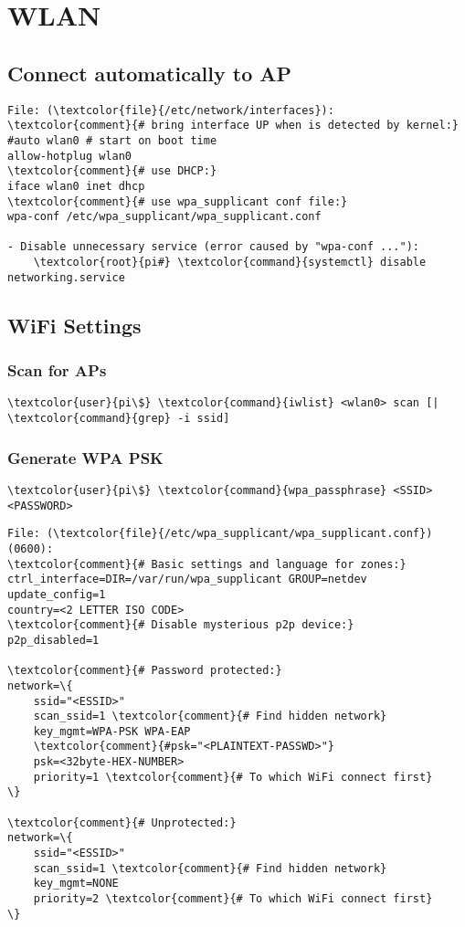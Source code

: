 \documentclass[10pt, a4paper, onecolumn, openany]{book} %
\begin{document}
\section{WLAN}
\subsection{Connect automatically to AP}
\begin{Verbatim}[commandchars=\\\{\}]
File: (\textcolor{file}{/etc/network/interfaces}):
\textcolor{comment}{# bring interface UP when is detected by kernel:}
#auto wlan0 # start on boot time
allow-hotplug wlan0
\textcolor{comment}{# use DHCP:}
iface wlan0 inet dhcp
\textcolor{comment}{# use wpa_supplicant conf file:}
wpa-conf /etc/wpa_supplicant/wpa_supplicant.conf

- Disable unnecessary service (error caused by "wpa-conf ..."):
    \textcolor{root}{pi#} \textcolor{command}{systemctl} disable networking.service
\end{Verbatim}
\subsection{WiFi Settings}
\subsubsection{Scan for APs}
\begin{Verbatim}[commandchars=\\\{\}]
    \textcolor{user}{pi\$} \textcolor{command}{iwlist} <wlan0> scan [| \textcolor{command}{grep} -i ssid]
\end{Verbatim}

\subsubsection{Generate WPA PSK}
\begin{Verbatim}[commandchars=\\\{\}]
    \textcolor{user}{pi\$} \textcolor{command}{wpa_passphrase} <SSID> <PASSWORD>
\end{Verbatim}

\begin{Verbatim}[commandchars=\\\{\}]
File: (\textcolor{file}{/etc/wpa_supplicant/wpa_supplicant.conf}) (0600):
\textcolor{comment}{# Basic settings and language for zones:}
ctrl_interface=DIR=/var/run/wpa_supplicant GROUP=netdev
update_config=1
country=<2 LETTER ISO CODE>
\textcolor{comment}{# Disable mysterious p2p device:}
p2p_disabled=1

\textcolor{comment}{# Password protected:}
network=\{
    ssid="<ESSID>"
    scan_ssid=1 \textcolor{comment}{# Find hidden network}
    key_mgmt=WPA-PSK WPA-EAP
    \textcolor{comment}{#psk="<PLAINTEXT-PASSWD>"}
    psk=<32byte-HEX-NUMBER>
    priority=1 \textcolor{comment}{# To which WiFi connect first}
\}

\textcolor{comment}{# Unprotected:}
network=\{
    ssid="<ESSID>"
    scan_ssid=1 \textcolor{comment}{# Find hidden network}
    key_mgmt=NONE
    priority=2 \textcolor{comment}{# To which WiFi connect first}
\}
\end{Verbatim}
\end{document}
